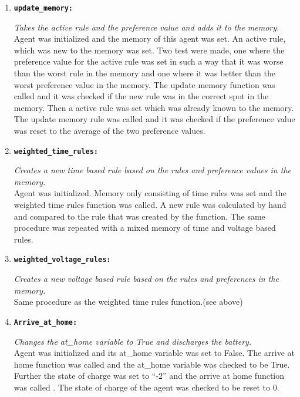 \documentclass[a4paper]{article}
\begin{document}
\begin{enumerate}
  \item \begin{alltt}\textbf{update_memory:}\end{alltt}
  \textit{Takes the active rule and the preference value and adds it to the memory.}\\
  Agent was initialized and the memory of this agent was set. An active rule, which was new to 
  the memory was set. Two test were made, one where the preference value for the active rule was set 
  in such a way that it was worse than the worst rule in the memory and one where it was better than the 
  worst preference value in the memory. The update memory function was called and it was checked if the new 
  rule was in the correct spot in the memory. Then a active rule was set which was already known to the memory. 
  The update memory rule was called and it was checked if the preference value was reset to the average of the two 
  preference values. 
  
  \item \begin{alltt}\textbf{weighted_time_rules:}\end{alltt}
  \textit{Creates a new time based rule based on the rules and preference values in the memory.}\\
  Agent was initialized.  Memory only consisting of time rules was set and the weighted time rules 
  function was called. A new rule was calculated by hand and compared to the rule that was created by 
  the function. The same procedure was repeated with a mixed memory of time and voltage based rules. 
  
  \item \begin{alltt}\textbf{weighted_voltage_rules:}\end{alltt}
  \textit{Creates a new voltage based rule based on the rules and preferences in the memory.} \\
  Same procedure as the weighted time rules function.(see above) 
  
  \item \begin{alltt}\textbf{Arrive_at_home:}\end{alltt}
  \textit{Changes the at\_home variable to True and discharges the battery.} \\
  Agent was initialized and its at\_home variable was set to False. The arrive at home  
  function was called 
  and the at\_home variable was checked to be True. Further the state of charge was set to “-2” and the 
  arrive at home function was called . The state of charge of the agent was checked to be reset to 0.
\end{enumerate}
\end{document}
